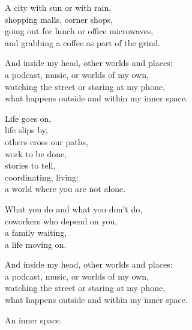 \begin{lyrics}
A city with sun or with rain,\\
shopping malls, corner shops,\\
going out for lunch or office microwaves,\\
and grabbing a coffee as part of the grind.

And inside my head, other worlds and places:\\
a podcast, music, or worlds of my own,\\
watching the street or staring at my phone,\\
what happens outside and within my inner space.

Life goes on,\\
life slips by,\\
others cross our paths,\\
work to be done,\\
stories to tell,\\
coordinating, living:\\
a world where you are not alone.

What you do and what you don't do,\\
coworkers who depend on you,\\
a family waiting,\\
a life moving on.

And inside my head, other worlds and places:\\
a podcast, music, or worlds of my own,\\
watching the street or staring at my phone,\\
what happens outside and within my inner space.

An inner space.
\end{lyrics}

